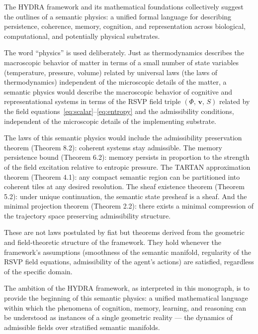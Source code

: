 \documentclass[12pt, a4paper, openany]{book}
\theoremstyle{plain}
\theoremstyle{definition}
\theoremstyle{remark}
\newcommand{\vvec}{\mathbf{v}}
\newcommand{\Sfield}{S}
\newcommand{\RSVPtriple}{(\Phi,\,\vvec,\,\Sfield)}
\begin{document}
The HYDRA framework and its mathematical foundations collectively suggest the outlines of a semantic physics: a unified formal language for describing persistence, coherence, memory, cognition, and representation across biological, computational, and potentially physical substrates.

The word ``physics'' is used deliberately. Just as thermodynamics describes the macroscopic behavior of matter in terms of a small number of state variables (temperature, pressure, volume) related by universal laws (the laws of thermodynamics) independent of the microscopic details of the matter, a semantic physics would describe the macroscopic behavior of cognitive and representational systems in terms of the RSVP field triple $\RSVPtriple$ related by the field equations~\eqref{eq:scalar}--\eqref{eq:entropy} and the admissibility conditions, independent of the microscopic details of the implementing substrate.

The laws of this semantic physics would include the admissibility preservation theorem (Theorem 8.2): coherent systems stay admissible. The memory persistence bound (Theorem 6.2): memory persists in proportion to the strength of the field excitation relative to entropic pressure. The TARTAN approximation theorem (Theorem 4.1): any compact semantic region can be partitioned into coherent tiles at any desired resolution. The sheaf existence theorem (Theorem 5.2): under unique continuation, the semantic state presheaf is a sheaf. And the minimal projection theorem (Theorem 2.2): there exists a minimal compression of the trajectory space preserving admissibility structure.

These are not laws postulated by fiat but theorems derived from the geometric and field-theoretic structure of the framework. They hold whenever the framework's assumptions (smoothness of the semantic manifold, regularity of the RSVP field equations, admissibility of the agent's actions) are satisfied, regardless of the specific domain.

The ambition of the HYDRA framework, as interpreted in this monograph, is to provide the beginning of this semantic physics: a unified mathematical language within which the phenomena of cognition, memory, learning, and reasoning can be understood as instances of a single geometric reality --- the dynamics of admissible fields over stratified semantic manifolds.

\end{document}
